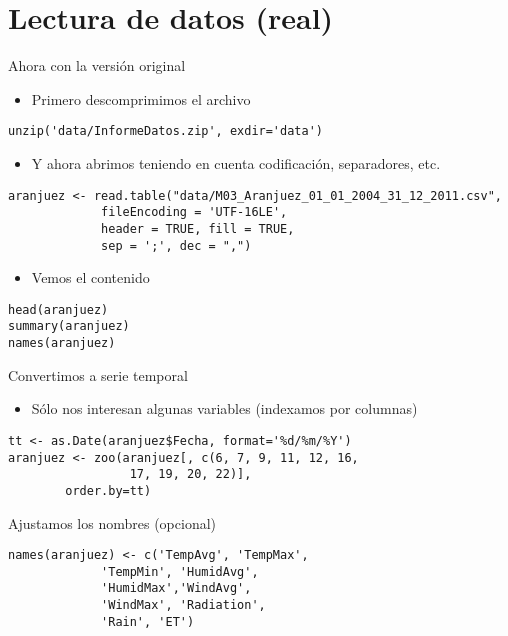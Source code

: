 \documentclass[xcolor={usenames,svgnames,dvipsnames}]{beamer}
\begin{document}
\section{Lectura de datos (real)}
\label{sec-2}
\begin{frame}[fragile,label=sec-2-1]{Ahora con la versión original}
 \begin{itemize}
\item Primero descomprimimos el archivo
\end{itemize}
\lstset{language=R,numbers=none}
\begin{lstlisting}
unzip('data/InformeDatos.zip', exdir='data')
\end{lstlisting}
\begin{itemize}
\item Y ahora abrimos teniendo en cuenta codificación, separadores, etc.
\end{itemize}
\lstset{language=R,numbers=none}
\begin{lstlisting}
aranjuez <- read.table("data/M03_Aranjuez_01_01_2004_31_12_2011.csv",
		     fileEncoding = 'UTF-16LE',
		     header = TRUE, fill = TRUE,
		     sep = ';', dec = ",")
\end{lstlisting}
\begin{itemize}
\item Vemos el contenido
\end{itemize}
\lstset{language=R,numbers=none}
\begin{lstlisting}
head(aranjuez)
summary(aranjuez)
names(aranjuez)
\end{lstlisting}
\end{frame}
\begin{frame}[fragile,label=sec-2-2]{Convertimos a serie temporal}
 \begin{itemize}
\item Sólo nos interesan algunas variables (indexamos por columnas)
\end{itemize}
\lstset{language=R,numbers=none}
\begin{lstlisting}
tt <- as.Date(aranjuez$Fecha, format='%d/%m/%Y')
aranjuez <- zoo(aranjuez[, c(6, 7, 9, 11, 12, 16,
			     17, 19, 20, 22)],
		order.by=tt)
\end{lstlisting}
\end{frame}
\begin{frame}[fragile,label=sec-2-3]{Ajustamos los nombres (opcional)}
 \lstset{language=R,numbers=none}
\begin{lstlisting}
names(aranjuez) <- c('TempAvg', 'TempMax',
		     'TempMin', 'HumidAvg',
		     'HumidMax','WindAvg',
		     'WindMax', 'Radiation',
		     'Rain', 'ET')
\end{lstlisting}
\end{frame}
\end{document}

